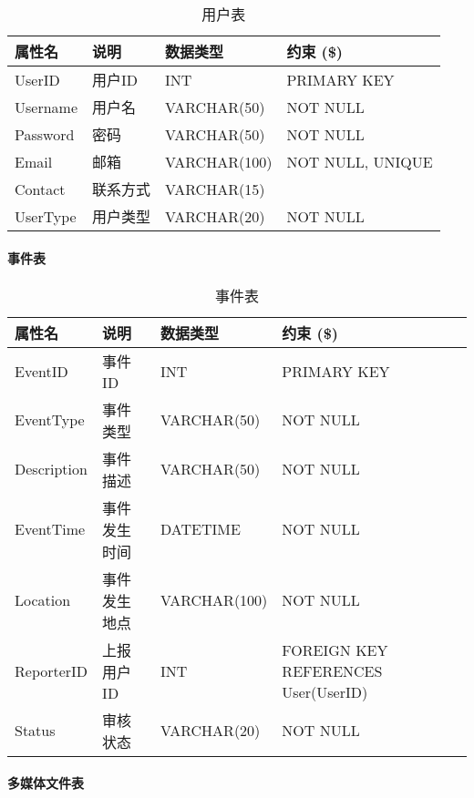 \begin{table}[!hpt]
    \caption{用户表}
    \label{tab:rela-user}
    \centering
    \begin{tabular}{@{}llll@{}} \toprule
        \textbf{属性名} & \textbf{说明} & \textbf{数据类型} & \textbf{约束} (\$) \\ \midrule
        UserID & 用户ID & INT & PRIMARY KEY \\
        Username & 用户名 & VARCHAR(50) & NOT NULL \\
        Password & 密码 & VARCHAR(50) & NOT NULL \\
        Email & 邮箱 & VARCHAR(100) & NOT NULL, UNIQUE \\
        Contact & 联系方式 & VARCHAR(15) &  \\
        UserType & 用户类型 & VARCHAR(20) & NOT NULL \\ \bottomrule
    \end{tabular}
\end{table}

\paragraph{事件表}

\begin{table}[!hpt]
    \caption{事件表}
    \label{tab:rela-event}
    \centering
    \begin{tabular}{@{}llll@{}} \toprule
        \textbf{属性名} & \textbf{说明} & \textbf{数据类型} & \textbf{约束} (\$) \\ \midrule
        EventID & 事件ID & INT & PRIMARY KEY \\
        EventType & 事件类型 & VARCHAR(50) & NOT NULL \\
        Description & 事件描述 & VARCHAR(50) & NOT NULL \\
        EventTime & 事件发生时间 & DATETIME & NOT NULL \\
        Location & 事件发生地点 & VARCHAR(100) & NOT NULL \\
        ReporterID & 上报用户ID & INT & FOREIGN KEY REFERENCES User(UserID) \\
        Status & 审核状态 & VARCHAR(20) & NOT NULL \\ \bottomrule
    \end{tabular}
\end{table}

\paragraph{多媒体文件表}

